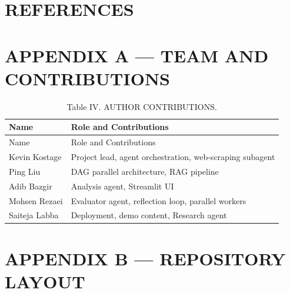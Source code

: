 \documentclass[
  twocolumn]{article}
\begin{document}
\section{REFERENCES}\label{references}

\section{APPENDIX A --- TEAM AND
CONTRIBUTIONS}\label{appendix-a-team-and-contributions}

\begin{longtable}[]{@{}ll@{}}
\caption{Table IV. AUTHOR CONTRIBUTIONS.}\tabularnewline
\toprule\noalign{}
Name & Role and Contributions \\
\midrule\noalign{}
\endfirsthead
\toprule\noalign{}
Name & Role and Contributions \\
\midrule\noalign{}
\endhead
\bottomrule\noalign{}
\endlastfoot
Kevin Kostage & Project lead, agent orchestration, web-scraping
subagent \\
Ping Liu & DAG parallel architecture, RAG pipeline \\
Adib Bazgir & Analysis agent, Streamlit UI \\
Mohsen Rezaei & Evaluator agent, reflection loop, parallel workers \\
Saiteja Labba & Deployment, demo content, Research agent \\
\end{longtable}

\section{APPENDIX B --- REPOSITORY
LAYOUT}\label{appendix-b-repository-layout}
\end{document}
